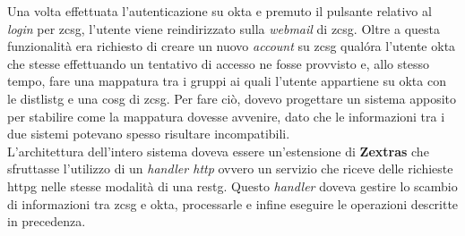 Una volta effettuata l'autenticazione su \gls{okta} e premuto il pulsante relativo al \textit{login} per \gls{zcsg}, l'utente viene reindirizzato sulla \textit{webmail} di \gls{zcsg}.
Oltre a questa funzionalità era richiesto di creare un nuovo \textit{account} su \gls{zcsg} qualóra l'utente \gls{okta} che stesse effettuando un tentativo di accesso ne fosse provvisto e, allo stesso tempo, fare una mappatura tra i gruppi ai quali l'utente appartiene su \gls{okta} con le \gls{distlistg} e una \gls{cosg} di \gls{zcsg}. Per fare ciò, dovevo progettare un sistema apposito per stabilire come la mappatura dovesse avvenire, dato che le informazioni tra i due sistemi potevano spesso risultare incompatibili. \\
L'architettura dell'intero sistema doveva essere un'estensione di \textbf{Zextras} che sfruttasse l'utilizzo di un \textit{handler http} ovvero un servizio che riceve delle richieste \gls{httpg} nelle stesse modalità di una \gls{restg}. Questo \textit{handler} doveva gestire lo scambio di informazioni tra \gls{zcsg} e \gls{okta}, processarle e infine eseguire le operazioni descritte in precedenza.

